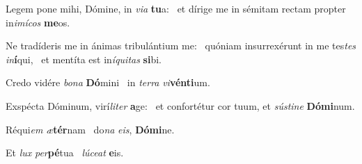 \item Legem pone mihi, Dómine, in \textit{via} \textbf{tu}a:~\psstar{} et dírige me in sémitam rectam propter in\textit{imícos} \textbf{me}os.
\item Ne tradíderis me in ánimas tribulántium me:~\pscross{} quóniam insurrexérunt in me tes\textit{tes} \textit{in}\textbf{í}qui,~\psstar{} et mentíta est in\textit{íquitas} \textbf{si}bi.
\item Credo vidére \textit{bona} \textbf{Dó}mini~\psstar{} in \textit{terra} \textit{vi}\textbf{vén}\textbf{ti}um.
\item Exspécta Dóminum, virí\textit{liter} \textbf{a}ge:~\psstar{} et confortétur cor tuum, et \textit{sústine} \textbf{Dó}\textbf{mi}num.
\item Réqui\textit{em} \textit{æ}\textbf{tér}nam~\psstar{} do\textit{na} \textit{eis}, \textbf{Dó}\textbf{mi}ne.
\item Et \textit{lux} \textit{per}\textbf{pé}tua~\psstar{} \textit{lúceat} \textbf{e}is.